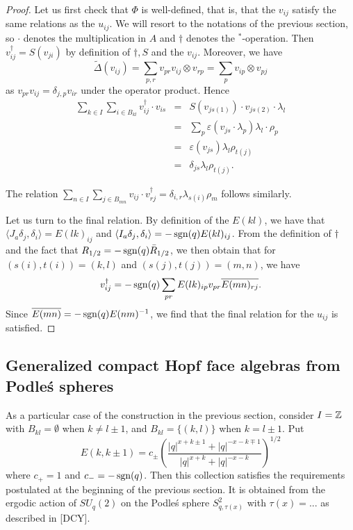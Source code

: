 \begin{proof} Let us first check that $\Phi$ is well-defined, that is, that the $v_{ij}$ satisfy the same relations as the $u_{ij}$. We will resort to the notations of the previous section, so $\cdot$ denotes the multiplication in $A$ and $\dag$ denotes the $^*$-operation. Then $v_{ij}^{\dag} = S(v_{ji})$ by definition of $\dag,S$ and the $v_{ij}$. Moreover, we have \[\widetilde{\Delta}(v_{ij}) = \sum_{p,r} v_{pr}v_{ij}\otimes v_{rp} = \sum_p  v_{ip}\otimes v_{pj}\] as $v_{pr}v_{ij} = \delta_{j,p}v_{ir}$ under the operator product. Hence \begin{eqnarray*} \sum_{k\in I}\sum_{i\in B_{kl}} v_{ij}^{\dag}\cdot v_{is} &=& S(v_{js(1)})\cdot v_{js(2)}\cdot\lambda_l \\ &=& \sum_p \varepsilon(v_{js}\cdot \lambda_p)\lambda_l\cdot\rho_p \\ &=& \varepsilon(v_{js}) \lambda_l\rho_{t(j)} \\ &=& \delta_{js}\lambda_l\rho_{t(j)}.\end{eqnarray*}

The relation $\sum_{n\in I}\sum_{j\in B_{mn}} v_{ij}\cdot v_{rj}^{\dag} = \delta_{i,r}\lambda_{s(i)}\rho_m$ follows similarly.

Let us turn to the final relation. By definition of the $E(kl)$, we have that $\langle J_a\delta_j,\delta_i\rangle =E(lk)_{ij}$ and $\langle I_a\delta_j,\delta_i\rangle = -\operatorname{\mathrm{sgn}}(q)E(kl)_{ij}$. From the definition of $\dag$ and the fact that $R_{1/2} = -\operatorname{\mathrm{sgn}}(q)\bar{R}_{1/2}$, we then obtain that for $(s(i),t(i))=(k,l)$ and $(s(j),t(j))=(m,n)$, we have \[v_{ij}^{\dag} = -\operatorname{\mathrm{sgn}}(q)\sum_{pr} E(lk)_{ip} v_{pr} \overline{E(mn)_{rj}}.\] Since $\overline{E(mn)} = -\operatorname{\mathrm{sgn}}(q)E(nm)^{-1}$, we find that the final relation for the $u_{ij}$ is satisfied.

\end{proof}

\subsection{Generalized compact Hopf face algebras from Podle\'{s} spheres}

As a particular case of the construction in the previous section, consider $I = \mathbb{Z}$ with $B_{kl} =\emptyset$ when $k\neq l\pm 1$, and $B_{kl} = \{(k,l)\}$ when $k = l\pm 1$. Put \[E(k,k\pm1) =c_{\pm}\left(\frac{|q|^{x+k\pm1}+|q|^{-x-k\mp1}}{|q|^{x+k}+|q|^{-x-k}}\right)^{1/2}\] where $c_{+}=1$ and $c_-=-\operatorname{\mathrm{sgn}}(q)$. Then this collection satisfies the requirements postulated at the beginning of the previous section. It is obtained from the ergodic action of $SU_q(2)$ on the Podle\'{s} sphere $S_{q,\tau(x)}^2$ with $\tau(x) = ...$ as described in [DCY].

